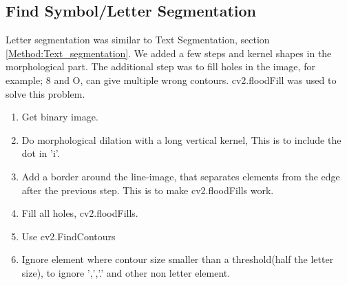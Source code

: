 \documentclass[Report.tex]{subfiles}
\begin{document}
\subsection{Find Symbol/Letter Segmentation}\label{subsec:Find_Symb}
Letter segmentation was similar to Text Segmentation, section \ref{Method:Text_segmentation}. We added a few steps and kernel shapes in the morphological part. The additional step was to fill holes in the image, for example; 8 and O, can give multiple wrong contours. cv2.floodFill was used to solve this problem.
\begin{enumerate}
  \item Get binary image.
  \item Do morphological dilation with a long vertical kernel, This is to include the dot in 'i'.
  \item Add a border around the line-image, that separates elements from the edge after the previous step. This is to make cv2.floodFills work.
  \item Fill all holes, cv2.floodFills.
  \item Use cv2.FindContours
  \item Ignore element where contour size smaller than a threshold(half the letter size), to ignore ',','.' and other non letter element.
\end{enumerate}
\end{document}
